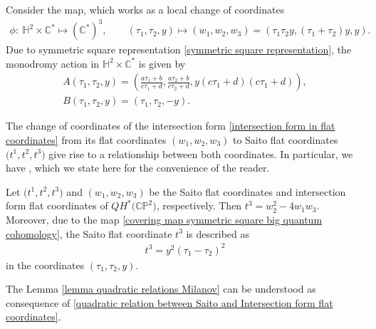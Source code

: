 Consider the map, which works as a local change of coordinates
\begin{gather}
\phi\colon\ \mathbb{H}^2\times \mathbb{C}^{*}\mapsto {(\mathbb{C}^{*})}^3, \qquad (\tau_1,\tau_2,y)\mapsto (w_1,w_2,w_3) =(\tau_1\tau_2y,(\tau_1+\tau_2)y,y).\label{covering map symmetric square big quantum cohomology}
\end{gather}
Due to symmetric square representation \eqref{symmetric square representation}, the monodromy action in $\mathbb{H}^2\times \mathbb{C}^{*}$ is given by
\begin{gather}
A(\tau_1,\tau_2,y)=\left( \frac{a\tau_1+b}{c\tau_1+d}, \frac{a\tau_2+b}{c\tau_2+d}, y(c\tau_1+d)(c\tau_1+d)\right),\nonumber\\
B(\tau_1,\tau_2,y)=(\tau_1,\tau_2,-y).\label{diagonal action of PSL2Z times a1}
\end{gather}

The change of coordinates of the intersection form \eqref{intersection form in flat coordinates} from its flat coordinates $(w_1,w_2,w_3)$ to Saito flat coordinates $\bigl(t^1,t^2,t^3\bigr)$ give rise to a relationship between both coordinates. In particular, we have \cite[Lemma 5.9]{Milanov}, which we state here for the convenience of the reader.

\begin{Lemma}\label{lemma quadratic relations Milanov}
Let $\bigl(t^1,t^2,t^3\bigr)$ and $(w_1,w_2,w_3)$ be the Saito flat coordinates and intersection form flat coordinates of $QH^{*}\bigl(\mathbb{CP}^2\bigr)$, respectively. Then
$
t^3=w_2^2-4w_1w_3$.
Moreover, due to the map \eqref{covering map symmetric square big quantum cohomology}, the Saito flat coordinate $t^3$ is described as
\begin{gather}\label{t3 change of coordinate 2}
 t^3=y^2(\tau_1-\tau_2 )^2
\end{gather}
in the coordinates $(\tau_1,\tau_2,y)$.
\end{Lemma}

\begin{Remark}
The Lemma \ref{lemma quadratic relations Milanov} can be understood as consequence of \eqref{quadratic relation between Saito and Intersection form flat coordinates}.

\end{Remark}








